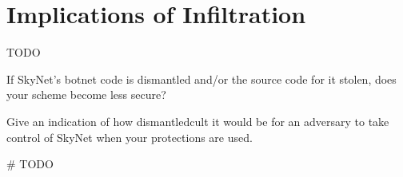 \documentclass[9pt,a4paper]{article}
\begin{document}
\section{Implications of Infiltration}
\vspace{-2ex}
TODO

If SkyNet's botnet code is dismantled and/or the source code for it stolen, does your scheme become less secure?


Give an indication of how dismantledcult it would be for an adversary to take control of SkyNet when your protections are used.

\begin{center}
\vspace{-2ex}
\begin{python}
# TODO
\end{python}\end{center}
\end{document}
